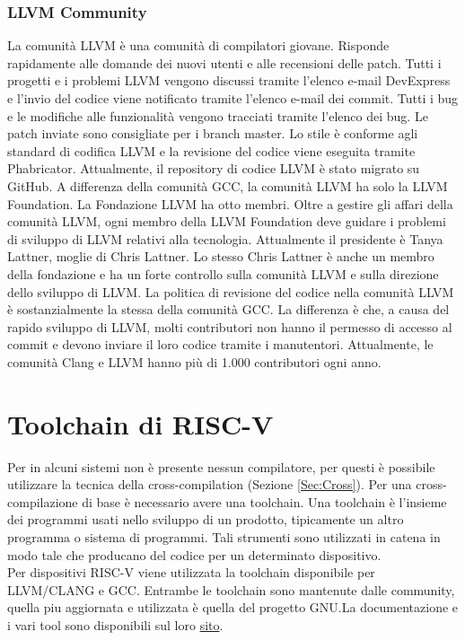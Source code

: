 \documentclass[12pt,a4paper]{report}
\begin{document}
\subsubsection{LLVM Community}
La comunità LLVM è una comunità di compilatori giovane. Risponde rapidamente alle domande dei nuovi utenti e alle recensioni delle patch. 
Tutti i progetti e i problemi LLVM vengono discussi tramite l'elenco e-mail DevExpress e l'invio del codice viene notificato tramite l'elenco e-mail dei commit. Tutti i bug e le modifiche alle funzionalità vengono tracciati tramite l'elenco dei bug. Le patch inviate sono consigliate per i branch master. Lo stile è conforme agli standard di codifica LLVM e la revisione del codice viene eseguita tramite Phabricator. Attualmente, il repository di codice LLVM è stato migrato su GitHub.
A differenza della comunità GCC, la comunità LLVM ha solo la LLVM Foundation. La Fondazione LLVM ha otto membri. Oltre a gestire gli affari della comunità LLVM, ogni membro della LLVM Foundation deve guidare i problemi di sviluppo di LLVM relativi alla tecnologia. Attualmente il presidente è Tanya Lattner, moglie di Chris Lattner. Lo stesso Chris Lattner è anche un membro della fondazione e ha un forte controllo sulla comunità LLVM e sulla direzione dello sviluppo di LLVM.
La politica di revisione del codice nella comunità LLVM è sostanzialmente la stessa della comunità GCC. La differenza è che, a causa del rapido sviluppo di LLVM, molti contributori non hanno il permesso di accesso al commit e devono inviare il loro codice tramite i manutentori. Attualmente, le comunità Clang e LLVM hanno più di 1.000 contributori ogni anno. 


\section{Toolchain di RISC-V}
Per in alcuni sistemi non è presente nessun compilatore, per questi è possibile utilizzare la tecnica della cross-compilation (Sezione \ref{Sec:Cross}).  Per una cross-compilazione di base è necessario avere una toolchain. Una toolchain è l'insieme dei programmi usati nello sviluppo di un prodotto, tipicamente un altro programma o sistema di programmi. Tali strumenti sono utilizzati in catena in modo tale che producano del codice per un determinato dispositivo.\\
Per dispositivi RISC-V viene utilizzata la toolchain disponibile per LLVM/CLANG e GCC. Entrambe le toolchain sono mantenute dalle community, quella piu aggiornata e utilizzata è quella del progetto GNU.La documentazione e i vari tool sono disponibili sul loro \href{ http://riscv.org/software-tools/}{sito}.
\end{document}

